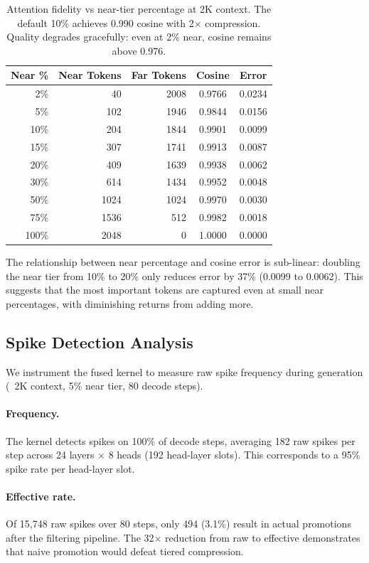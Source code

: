 \documentclass{article}
\begin{document}
\begin{table}[ht]
\centering
\begin{tabular}{rrrcc}
\toprule
Near \% & Near Tokens & Far Tokens & Cosine & Error \\
\midrule
2\%  &   40 & 2008 & 0.9766 & 0.0234 \\
5\%  &  102 & 1946 & 0.9844 & 0.0156 \\
10\% &  204 & 1844 & 0.9901 & 0.0099 \\
15\% &  307 & 1741 & 0.9913 & 0.0087 \\
20\% &  409 & 1639 & 0.9938 & 0.0062 \\
30\% &  614 & 1434 & 0.9952 & 0.0048 \\
50\% & 1024 & 1024 & 0.9970 & 0.0030 \\
75\% & 1536 &  512 & 0.9982 & 0.0018 \\
100\% & 2048 &   0 & 1.0000 & 0.0000 \\
\bottomrule
\end{tabular}
\caption{Attention fidelity vs near-tier percentage at 2K context.
The default 10\% achieves 0.990 cosine with 2$\times$ compression.
Quality degrades gracefully: even at 2\% near, cosine remains above
0.976.}
\label{tab:tier_ratio}
\end{table}

The relationship between near percentage and cosine error is
sub-linear: doubling the near tier from 10\% to 20\% only reduces
error by 37\% (0.0099 to 0.0062). This suggests that the most
important tokens are captured even at small near percentages,
with diminishing returns from adding more.

\subsection{Spike Detection Analysis}

We instrument the fused kernel to measure raw spike frequency during
generation (~2K context, 5\% near tier, 80 decode steps).

\paragraph{Frequency.} The kernel detects spikes on 100\% of decode
steps, averaging 182 raw spikes per step across 24 layers $\times$ 8
heads (192 head-layer slots). This corresponds to a 95\% spike rate
per head-layer slot.

\paragraph{Effective rate.} Of 15,748 raw spikes over 80 steps, only
494 (3.1\%) result in actual promotions after the filtering pipeline.
The 32$\times$ reduction from raw to effective demonstrates that
naive promotion would defeat tiered compression.
\end{document}
